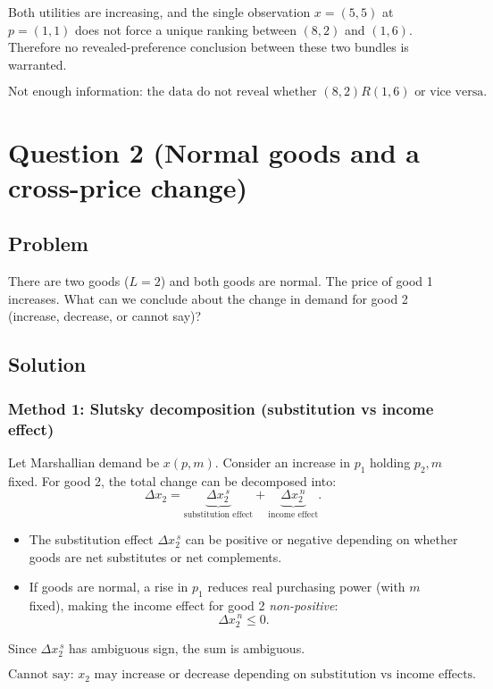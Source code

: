 \documentclass[12pt]{article}
\begin{document}
Both utilities are increasing, and the single observation \(x=(5,5)\) at \(p=(1,1)\) does not force a unique ranking between \((8,2)\) and \((1,6)\).
Therefore no revealed-preference conclusion between these two bundles is warranted.

\[
\boxed{\text{Not enough information: the data do not reveal whether }(8,2)R(1,6)\text{ or vice versa.}}
\]

\newpage
\section*{Question 2 (Normal goods and a cross-price change)}
\subsection*{Problem}
There are two goods (\(L=2\)) and both goods are normal.
The price of good 1 increases.
What can we conclude about the change in demand for good 2 (increase, decrease, or cannot say)?

\subsection*{Solution}

\subsubsection*{Method 1: Slutsky decomposition (substitution vs income effect)}
Let Marshallian demand be \(x(p,m)\). Consider an increase in \(p_1\) holding \(p_2,m\) fixed.
For good 2, the total change can be decomposed into:
\[
\Delta x_2
=\underbrace{\Delta x_2^{\,s}}_{\text{substitution effect}}
+\underbrace{\Delta x_2^{\,n}}_{\text{income effect}}.
\]
\begin{itemize}[leftmargin=*]
\item The substitution effect \(\Delta x_2^{\,s}\) can be positive or negative depending on whether goods are net substitutes or net complements.
\item If goods are normal, a rise in \(p_1\) reduces real purchasing power (with \(m\) fixed), making the income effect for good 2 \emph{non-positive}:
\[
\Delta x_2^{\,n}\le 0.
\]
\end{itemize}
Since \(\Delta x_2^{\,s}\) has ambiguous sign, the sum is ambiguous.

\[
\boxed{\text{Cannot say: }x_2\text{ may increase or decrease depending on substitution vs income effects.}}
\]
\end{document}
